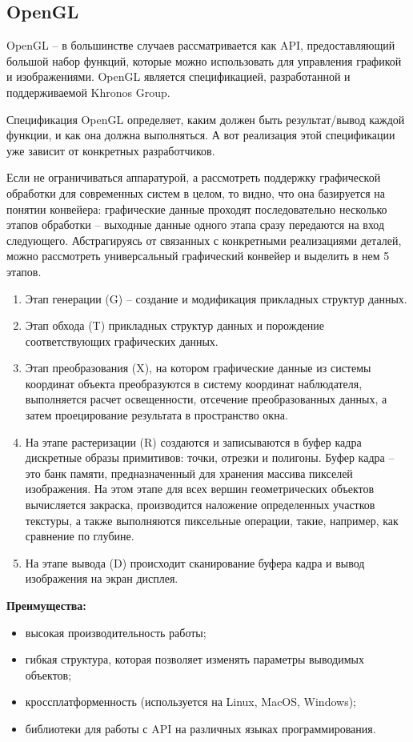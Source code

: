 \subsection{OpenGL}

OpenGL -- в большинстве случаев рассматривается как API, предоставляющий большой набор функций, которые можно использовать для управления графикой и изображениями. OpenGL является спецификацией, разработанной и поддерживаемой Khronos Group.

Спецификация OpenGL определяет, каким должен быть результат/вывод каждой функции, и как она должна выполняться. А вот реализация этой спецификации уже зависит от конкретных разработчиков.

Если не ограничиваться аппаратурой, а рассмотреть поддержку графической обработки для современных систем в целом, то видно, что она базируется на понятии конвейера: графические данные проходят последовательно несколько этапов обработки -- выходные данные одного этапа сразу передаются на вход следующего. Абстрагируясь от связанных с конкретными реализациями деталей, можно рассмотреть универсальный графический конвейер и выделить в нем 5 этапов.

\begin{enumerate}
    \item Этап генерации (G) -- создание и модификация прикладных структур данных.
    \item Этап обхода (T) прикладных структур данных и порождение соответствующих графических данных.
    \item Этап преобразования (X), на котором графические данные из системы координат объекта преобразуются в систему координат наблюдателя, выполняется расчет освещенности, отсечение преобразованных данных, а затем проецирование результата в пространство окна.
    \item На этапе растеризации (R) создаются и записываются в буфер кадра дискретные образы примитивов: точки, отрезки и полигоны. Буфер кадра -- это банк памяти, предназначенный для хранения массива пикселей изображения. На этом этапе для всех вершин геометрических объектов вычисляется закраска, производится наложение определенных участков текстуры, а также выполняются пиксельные операции, такие, например, как сравнение по глубине.
    \item На этапе вывода (D) происходит сканирование буфера кадра и вывод изображения на экран дисплея.
\end{enumerate}


\textbf{Преимущества:} 
\begin{itemize}
    \item высокая производительность работы;
    \item гибкая структура, которая позволяет изменять параметры выводимых объектов;
    \item кроссплатформенность (используется на Linux, MacOS, Windows);
    \item библиотеки для работы с API на различных языках программирования.
\end{itemize}


